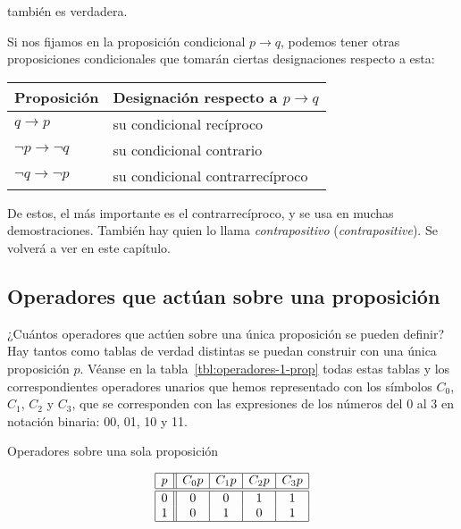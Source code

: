 \noindent también es verdadera.

Si nos fijamos en la proposición condicional $p \to q$, podemos tener otras
proposiciones condicionales que tomarán ciertas designaciones respecto a
esta:

\begin{center}
\begin{tabular}{l|l}
  Proposición & Designación respecto a $p \to q$ \\
  \hline
  $q \rightarrow p$ & su condicional recíproco \\
  $\neg p \rightarrow \neg q$ & su condicional contrario \\
  $\neg q \rightarrow \neg p$ & su condicional contrarrecíproco \\
\end{tabular}
\end{center}

\noindent De estos, el más importante es el contrarrecíproco, y se usa en
muchas demostraciones. También hay quien lo llama \emph{contrapositivo}
(\emph{contrapositive}). Se volverá a ver en este capítulo.





\subsection{Operadores que actúan sobre una proposición}

¿Cuántos operadores que actúen sobre una única proposición se pueden
definir? Hay tantos como tablas de verdad distintas se puedan construir con
una única proposición $p$. Véanse en la tabla~\ref{tbl:operadores-1-prop}
todas estas tablas y los correspondientes operadores unarios que hemos
representado con los símbolos $C_0$, $C_1$, $C_2$ y $C_3$, que se
corresponden con las expresiones de los números del 0 al 3 en notación
binaria: 00, 01, 10 y 11.

\begin{table}[h]%
  \caption{Operadores sobre una sola proposición}
  \label{tbl:operadores-1-prop}%
  \centering
  $$
    \begin{array}{|c||c|c|c|c|}
      \hline
      p & C_0 p & C_1 p & C_2 p & C_3 p \\
      \hline
      \hline
      0 & 0 & 0 & 1 & 1 \\
      1 & 0 & 1 & 0 & 1 \\
      \hline
    \end{array}
  $$
\end{table}

